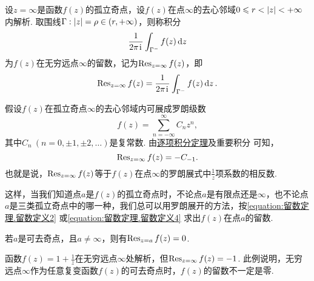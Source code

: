 \begin{definition}
设\(z=\infty\)是函数\(f(z)\)的孤立奇点，设\(f(z)\)在点\(\infty\)的去心邻域\(0 \leqslant r < \abs{z} < +\infty\)内解析.
取围线\(\Gamma: \abs{z} = \rho\in(r,+\infty)\)，则称积分\[
\frac{1}{2\pi\kern1pt\mathrm{i}\kern1pt} \int_{\Gamma^-} f(z) \dd{z}
\]为\(f(z)\)在无穷远点\(\infty\)的留数，记为\(\operatorname{Res}_{z=\infty} f(z)\)，即\begin{equation}\label{equation:留数定理.留数定义3}
\operatorname{Res}_{z=\infty} f(z)
= \frac{1}{2\pi\kern1pt\mathrm{i}\kern1pt} \int_{\Gamma^-} f(z) \dd{z}.
\end{equation}
\end{definition}
假设\(f(z)\)在孤立奇点\(\infty\)的去心邻域内可展成罗朗级数\[
f(z) = \sum\limits_{n=-\infty}^{\infty} C_n z^n,
\]其中\(C_n\ (n=0,\pm1,\pm2,\dotsc)\)是复常数.
由\hyperref[theorem:解析函数的级数表示.一致收敛级数的基本性质2]{逐项积分定理}及重要积分 可知，\begin{equation}\label{equation:留数定理.留数定义4}
\operatorname{Res}_{z=\infty} f(z) = - C_{-1}.
\end{equation}
也就是说，\(\operatorname{Res}_{z=\infty} f(z)\)等于\(f(z)\)在点\(\infty\)的罗朗展式中\(\frac{1}{z}\)项系数的相反数.

这样，当我们知道点\(a\)是\(f(z)\)的孤立奇点时，不论点\(a\)是有限点还是\(\infty\)，也不论点\(a\)是三类孤立奇点中的哪一种，我们总可以用罗朗展开的方法，按\cref{equation:留数定理.留数定义2} 或\cref{equation:留数定理.留数定义4} 求出\(f(z)\)在点\(a\)的留数.

\begin{property}
若\(a\)是可去奇点，且\(a\neq\infty\)，则有\(\operatorname{Res}_{z=a} f(z) = 0\).
\end{property}

\begin{example}
函数\(f(z) = 1 + \frac{1}{z}\)在无穷远点\(\infty\)处解析，但\(\operatorname{Res}_{z=\infty} f(z) = -1\).
此例说明，无穷远点\(\infty\)作为任意复变函数\(f(z)\)的可去奇点时，\(f(z)\)的留数不一定是零.
\end{example}

